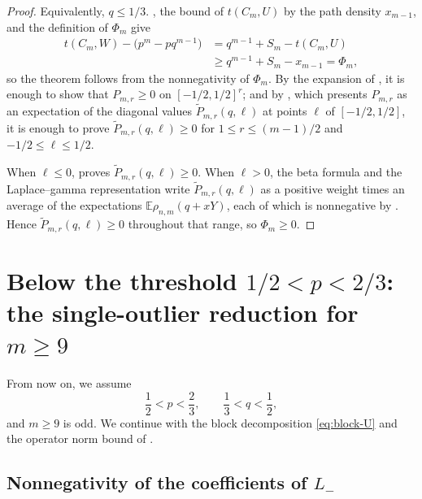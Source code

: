 \documentclass[11pt]{article}
\numberwithin{equation}{section}
\newcommand{\E}{\mathbb E}
\begin{document}
\begin{proof}
  Equivalently, $q\le1/3$.
  , the bound of $t(C_m,U)$ by the path density
  $x_{m-1}$, and the definition of $\Phi_m$ give
  \begin{align*}
    t(C_m,W)-\bigl(p^m-pq^{m-1}\bigr)
    &=q^{m-1}+S_m-t(C_m,U)\\
    &\ge q^{m-1}+S_m-x_{m-1}=\Phi_m,
  \end{align*}
  so the theorem follows from the nonnegativity of $\Phi_m$.  By the expansion
  of , it is enough to show that
  $P_{m,r}\ge0$ on $[-1/2,1/2]^r$; and by , which
  presents $P_{m,r}$ as an expectation of the diagonal values
  $\widetilde P_{m,r}(q,\ell)$ at points $\ell$ of $[-1/2,1/2]$, it is enough
  to prove $\widetilde P_{m,r}(q,\ell)\ge0$ for $1\le r\le(m-1)/2$ and
  $-1/2\le\ell\le1/2$.

  When $\ell\le0$,  proves
  $\widetilde P_{m,r}(q,\ell)\ge0$.  When $\ell>0$, the beta formula
   and the Laplace--gamma representation
   write $\widetilde P_{m,r}(q,\ell)$ as a
  positive weight times an average of the expectations
  $\E\rho_{n,m}(q+xY)$, each of which is nonnegative by
  .  Hence $\widetilde P_{m,r}(q,\ell)\ge0$
  throughout that range, so $\Phi_m\ge0$.
\end{proof}

\section{Below the threshold \texorpdfstring{$1/2<p<2/3$}{1/2<p<2/3}: the single-outlier reduction for \texorpdfstring{$m\ge9$}{m>=9}}
\label{sec:plt23}

From now on, we assume
\begin{equation}\label{eq:plt23-range}
  \frac{1}{2}<p<\frac{2}{3}, \qquad \frac{1}{3}<q<\frac{1}{2},
\end{equation}
and $m\ge9$ is odd. 
We continue with the block decomposition
\eqref{eq:block-U} and the operator norm bound of .

\subsection{Nonnegativity of the coefficients of \texorpdfstring{$L_-$}{L-}}\label{subsec:plt23-one-sided-schur}
\end{document}
